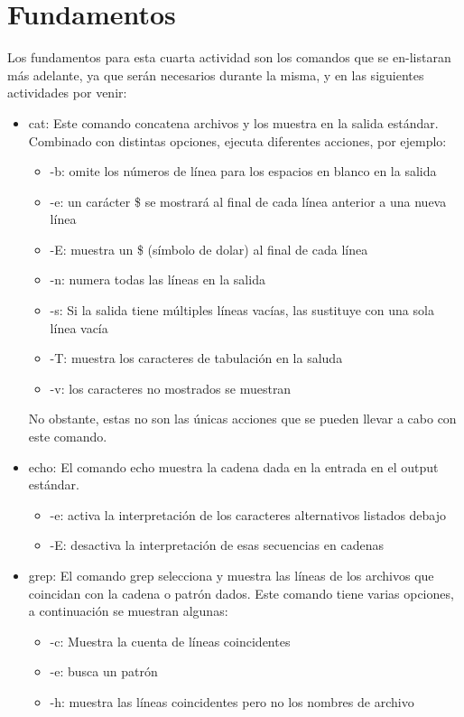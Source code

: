 \documentclass{article}
\begin{document}
\section{Fundamentos}
Los fundamentos para esta cuarta actividad son los comandos que se en-listaran más adelante, ya que serán necesarios durante la misma, y en las siguientes actividades por venir:
\begin{itemize}
\item cat:  Este comando concatena archivos y los muestra en la salida estándar. Combinado con distintas opciones, ejecuta diferentes acciones, por ejemplo:
	\begin{itemize}
    \item -b: omite los números de línea para los espacios en blanco en la salida
    \item -e: un carácter \$ se mostrará al final de cada línea anterior a una nueva línea
    \item -E: muestra un \$ (símbolo de dolar) al final de cada línea
    \item -n: numera todas las líneas en la salida
    \item -s: Si la salida tiene múltiples líneas vacías, las sustituye con una sola línea vacía
    \item -T: muestra los caracteres de tabulación en la saluda
    \item -v: los caracteres no mostrados se muestran
    \end{itemize}
    No obstante, estas no son las únicas acciones que se pueden llevar a cabo con este comando.
    \item echo: El comando echo muestra la cadena dada en la entrada en el output estándar.
	\begin{itemize}
    \item -e: activa la interpretación de los caracteres alternativos listados debajo
    \item -E: desactiva la interpretación de esas secuencias en cadenas
    \end{itemize}
\item grep: El comando grep selecciona y muestra las líneas de los archivos que coincidan con la cadena o patrón dados. Este comando tiene varias opciones, a continuación se muestran algunas:
	\begin{itemize}
    \item -c: Muestra la cuenta de líneas coincidentes
    \item -e: busca un patrón
    \item -h: muestra las líneas coincidentes pero no los nombres de archivo

\end{itemize}
\end{itemize}
\end{document}
